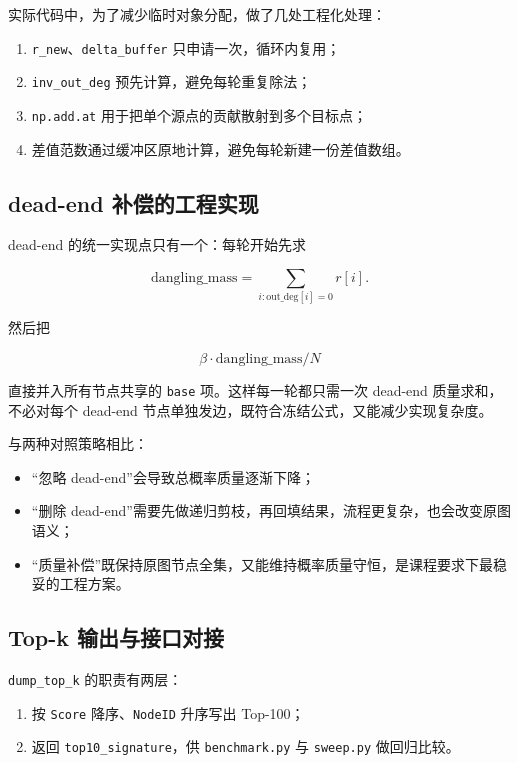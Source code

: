 \documentclass[UTF8,a4paper,12pt]{ctexart}
\begin{document}
实际代码中，为了减少临时对象分配，做了几处工程化处理：


\begin{enumerate}
\item \texttt{r\_new}、\texttt{delta\_buffer} 只申请一次，循环内复用；
\item \texttt{inv\_out\_deg} 预先计算，避免每轮重复除法；
\item \texttt{np.add.at} 用于把单个源点的贡献散射到多个目标点；
\item 差值范数通过缓冲区原地计算，避免每轮新建一份差值数组。
\end{enumerate}


\subsection{dead-end 补偿的工程实现}


dead-end 的统一实现点只有一个：每轮开始先求


\[ \mathrm{dangling\_mass}=\sum_{i:\mathrm{out\_deg}[i]=0} r[i]. \]


然后把


\[ \beta \cdot \mathrm{dangling\_mass} / N \]


直接并入所有节点共享的 \texttt{base} 项。这样每一轮都只需一次 dead-end 质量求和，不必对每个 dead-end 节点单独发边，既符合冻结公式，又能减少实现复杂度。


与两种对照策略相比：


\begin{itemize}
\item “忽略 dead-end”会导致总概率质量逐渐下降；
\item “删除 dead-end”需要先做递归剪枝，再回填结果，流程更复杂，也会改变原图语义；
\item “质量补偿”既保持原图节点全集，又能维持概率质量守恒，是课程要求下最稳妥的工程方案。
\end{itemize}


\subsection{Top-k 输出与接口对接}


\texttt{dump\_top\_k} 的职责有两层：


\begin{enumerate}
\item 按 \texttt{Score} 降序、\texttt{NodeID} 升序写出 Top-100；
\item 返回 \texttt{top10\_signature}，供 \texttt{benchmark.py} 与 \texttt{sweep.py} 做回归比较。
\end{enumerate}
\end{document}
